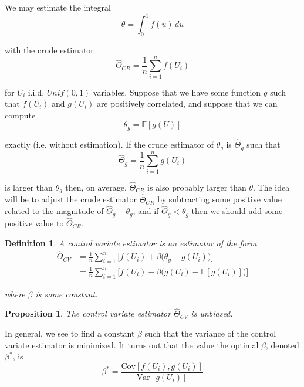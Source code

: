 \documentclass[12pt]{article}
\newtheorem{definition}{Definition}
\newtheorem{proposition}{Proposition}
\newlength\tindent
\renewcommand{\indent}{\hspace*{\tindent}}
\begin{document}
We may estimate the integral
\begin{equation*}
	\theta = \int^1_0 f(u)\,du
\end{equation*}

with the crude estimator
\begin{equation*}
	\hat{\Theta}_{CR} = \frac{1}{n} \sum^n_{i=1} f(U_i)
\end{equation*}

for $U_i$ i.i.d. $Unif(0,1)$ variables. Suppose that we have some function $g$ such that $f(U_i)$ and $g(U_i)$ are positively correlated, and suppose that we can compute
\begin{equation*}
	\theta_g = \mathbb E[g(U)]
\end{equation*}

exactly (i.e. without estimation). If the crude estimator of $\theta_g$ is $\hat{\Theta}_g$ such that
\begin{equation*}
	\hat{\Theta}_g = \frac{1}{n} \sum^n_{i=1} g(U_i)
\end{equation*}

is larger than $\theta_g$ then, on average, $\hat{\Theta}_{CR}$ is also probably larger than $\theta$. The idea will be to adjust the crude estimator $\hat{\Theta}_{CR}$ by subtracting some positive value related to the magnitude of $\hat{\Theta}_g - \theta_g$, and if $\hat{\Theta}_g < \theta_g$ then we should add some positive value to $\hat{\Theta}_{CR}$.

\begin{definition} A \underline{control variate estimator} is an estimator of the form
\begin{align*}
	\hat{\Theta}_{CV} &= \frac{1}{n} \sum^n_{i=1} \Big[f(U_i) + \beta \big(\theta_g - g(U_i)\big) \Big] \\
	&= \frac{1}{n} \sum^n_{i=1} \Big[f(U_i) - \beta \big(g(U_i) - \mathbb E[g(U_i)]\big)\Big]
\end{align*}

where $\beta$ is some constant.
\end{definition}

\begin{proposition} The control variate estimator $\hat{\Theta}_{CV}$ is unbiased.
\end{proposition}

\indent In general, we see to find a constant $\beta$ such that the variance of the control variate estimator is minimized. It turns out that the value the optimal $\beta$, denoted $\beta^*$, is
\begin{equation*}
	\beta^* = \frac{\mathrm{Cov}[f(U_i),g(U_i)]}{\mathrm{Var}[g(U_i)]}
\end{equation*}
\end{document}
